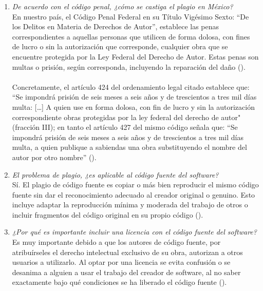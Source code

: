 \documentclass[a4paper]{article} %
\begin{document}
\begin{enumerate}
        \item \textit{De acuerdo con el código penal, ¿cómo se castiga el plagio en México?} \\
        En nuestro país, el Código Penal Federal en su Título Vigésimo Sexto: “De los Delitos en Materia de Derechos de Autor”, establece las penas correspondientes a aquellas personas que utilicen de forma dolosa, con fines de lucro o sin la autorización que corresponde, cualquier obra que se encuentre protegida por la Ley Federal del Derecho de Autor. Estas penas son multas o prisión, según corresponda, incluyendo la reparación del daño (\cite{codigo}).\\ \\
        Concretamente, el artículo 424 del ordenamiento legal citado establece que: ``Se impondrá prisión de seis meses a seis años y de trescientos a tres mil días multa: […] A quien use en forma dolosa, con fin de lucro y sin la autorización correspondiente obras protegidas por la ley federal del derecho de autor" (fracción III); en tanto el artículo 427 del mismo código señala que: ``Se impondrá prisión de seis meses a seis años y de trescientos a tres mil días multa, a quien publique a sabiendas una obra substituyendo el nombre del autor por otro nombre” (\cite{noticia}). \newline
        
        \item \textit{El problema de plagio, ¿es aplicable al código fuente del software?} \\
        Sí. El plagio de código fuente es copiar o más bien reproducir el mismo código fuente sin dar el reconocimiento adecuado al creador original o genuino. Esto incluye adaptar la reproducción mínima y moderada del trabajo de otros o incluir fragmentos del código original en su propio código (\cite{comprobadorplagio}). \newline
        
        \item \textit{¿Por qué es importante incluir una licencia con el código fuente del software?} \\
        Es muy importante debido a que los autores de código fuente, por atribuírseles el derecho intelectual exclusivo de su obra, autorizan a otros usuarios a utilizarlo. Al optar por una licencia se evita confusión o se desanima a alguien a usar el trabajo del creador de software, al no saber exactamente bajo qué condiciones se ha liberado el código fuente (\cite{adminproy}).
    \end{enumerate}
    \hfill \break
    \hfill \break
    \hfill \break
    \printbibliography %
\end{document}

